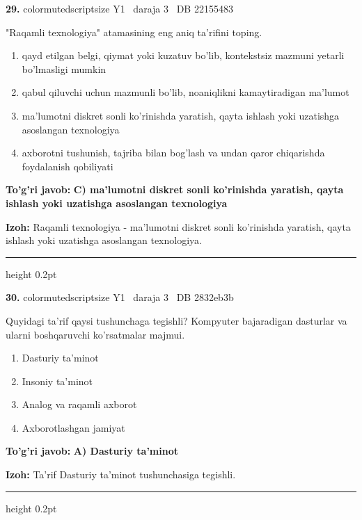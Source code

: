 \documentclass[10pt,a4paper,oneside]{article}
\begin{document}
\noindent\textbf{\color{ink}29.}  {color{muted}scriptsize Y1 \textbullet\ daraja 3 \textbullet\ DB 22155483}
\par
"Raqamli texnologiya" atamasining eng aniq ta'rifini toping.
\begin{enumerate}[label=\Alph*),leftmargin=9mm]
\item qayd etilgan belgi, qiymat yoki kuzatuv bo'lib, kontekstsiz mazmuni yetarli bo'lmasligi mumkin
\item qabul qiluvchi uchun mazmunli bo'lib, noaniqlikni kamaytiradigan ma'lumot
\item ma'lumotni diskret sonli ko'rinishda yaratish, qayta ishlash yoki uzatishga asoslangan texnologiya
\item axborotni tushunish, tajriba bilan bog'lash va undan qaror chiqarishda foydalanish qobiliyati
\end{enumerate}
\begin{tcolorbox}[enhanced,breakable,colback=teal!4,colframe=teal!50!black,boxrule=0.5pt,arc=1.1mm,left=3mm,right=3mm,top=1.7mm,bottom=1.7mm,before skip=2mm,after skip=2mm]
\textbf{\color{teal}To'g'ri javob:} \textbf{C) ma'lumotni diskret sonli ko'rinishda yaratish, qayta ishlash yoki uzatishga asoslangan texnologiya}
\par\smallskip
\textbf{Izoh:} Raqamli texnologiya - ma'lumotni diskret sonli ko'rinishda yaratish, qayta ishlash yoki uzatishga asoslangan texnologiya.
\end{tcolorbox}
\vspace{2mm}\hrule height 0.2pt \vspace{3mm}

\noindent\textbf{\color{ink}30.}  {color{muted}scriptsize Y1 \textbullet\ daraja 3 \textbullet\ DB 2832eb3b}
\par
Quyidagi ta'rif qaysi tushunchaga tegishli? Kompyuter bajaradigan dasturlar va ularni boshqaruvchi ko'rsatmalar majmui.
\begin{enumerate}[label=\Alph*),leftmargin=9mm]
\item Dasturiy ta'minot
\item Insoniy ta'minot
\item Analog va raqamli axborot
\item Axborotlashgan jamiyat
\end{enumerate}
\begin{tcolorbox}[enhanced,breakable,colback=teal!4,colframe=teal!50!black,boxrule=0.5pt,arc=1.1mm,left=3mm,right=3mm,top=1.7mm,bottom=1.7mm,before skip=2mm,after skip=2mm]
\textbf{\color{teal}To'g'ri javob:} \textbf{A) Dasturiy ta'minot}
\par\smallskip
\textbf{Izoh:} Ta'rif Dasturiy ta'minot tushunchasiga tegishli.
\end{tcolorbox}
\vspace{2mm}\hrule height 0.2pt \vspace{3mm}
\end{document}
